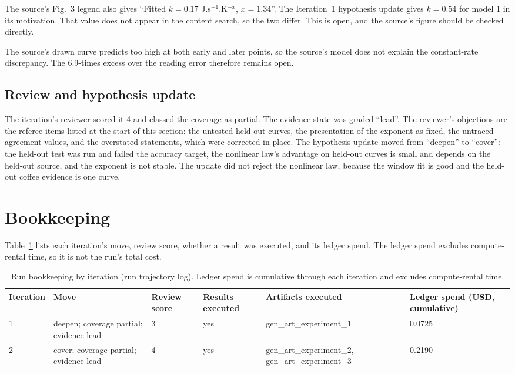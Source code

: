 \documentclass[11pt,letterpaper]{article}
\begin{document}
The source's Fig.~3 legend also gives ``Fitted $k = 0.17$ J.s$^{-1}$.K$^{-x}$, $x = 1.34$''. The Iteration~1 hypothesis update gives $k = 0.54$ for model 1 in its motivation. That value does not appear in the content search, so the two differ. This is open, and the source's figure should be checked directly.

The source's drawn curve predicts too high at both early and later points, so the source's model does not explain the constant-rate discrepancy. The 6.9-times excess over the reading error therefore remains open.

\subsection{Review and hypothesis update}

The iteration's reviewer scored it 4 and classed the coverage as partial. The evidence state was graded ``lead''. The reviewer's objections are the referee items listed at the start of this section: the untested held-out curves, the presentation of the exponent as fixed, the untraced agreement values, and the overstated statements, which were corrected in place. The hypothesis update moved from ``deepen'' to ``cover'': the held-out test was run and failed the accuracy target, the nonlinear law's advantage on held-out curves is small and depends on the held-out source, and the exponent is not stable. The update did not reject the nonlinear law, because the window fit is good and the held-out coffee evidence is one curve.

\section{Bookkeeping}

Table~\ref{tab:bookkeeping} lists each iteration's move, review score, whether a result was executed, and its ledger spend. The ledger spend excludes compute-rental time, so it is not the run's total cost.

\begin{table}[!htbp]
\centering
\footnotesize
\caption{Run bookkeeping by iteration (run trajectory log). Ledger spend is cumulative through each iteration and excludes compute-rental time.}
\label{tab:bookkeeping}
\begin{tabularx}{\linewidth}{XXXXXX}
\toprule
Iteration & Move & Review score & Results executed & Artifacts executed & Ledger spend (USD, cumulative) \\
\midrule
1 & deepen; coverage partial; evidence lead & 3 & yes & gen\_\allowbreak{}art\_\allowbreak{}experiment\_\allowbreak{}1 & 0.0725 \\
2 & cover; coverage partial; evidence lead & 4 & yes & gen\_\allowbreak{}art\_\allowbreak{}experiment\_\allowbreak{}2, \allowbreak gen\_\allowbreak{}art\_\allowbreak{}experiment\_\allowbreak{}3 & 0.2190 \\
\bottomrule
\end{tabularx}
\end{table}
\end{document}
